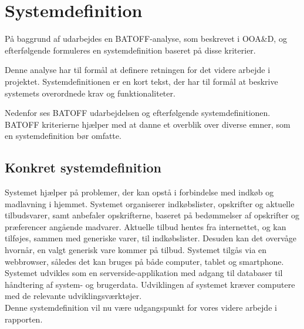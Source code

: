 \section{Systemdefinition}
På baggrund af  udarbejdes en BATOFF-analyse, som beskrevet i OOA\&D\citep{OOA&D2001}, og efterfølgende formuleres en systemdefinition baseret på disse kriterier.

Denne analyse har til formål at definere retningen for det videre arbejde i projektet.
Systemdefinitionen er en kort tekst, der har til formål at beskrive systemets overordnede krav og funktionaliteter.

Nedenfor ses BATOFF udarbejdelsen og efterfølgende systemdefinitionen.
BATOFF kriterierne hjælper med at danne et overblik over diverse emner, som en systemdefinition bør omfatte.




\subsection{Konkret systemdefinition}\label{Sysdef}

Systemet hjælper på problemer, der kan opstå i forbindelse med indkøb og madlavning i hjemmet.
Systemet organiserer indkøbslister, opskrifter og aktuelle tilbudsvarer, samt anbefaler opskrifterne, baseret på bedømmelser af opskrifter og præferencer angående madvarer.
Aktuelle tilbud hentes fra internettet, og kan tilføjes, sammen med generiske varer, til indkøbslister.
Desuden kan det overvåge hvornår, en valgt generisk vare kommer på tilbud.
Systemet tilgås via en webbrowser, således det kan bruges på både computer, tablet og smartphone.
Systemet udvikles som en serverside-applikation med adgang til databaser til håndtering af system- og brugerdata.
Udviklingen af systemet kræver computere med de relevante udviklingsværktøjer.\\

Denne systemdefinition vil nu være udgangspunkt for vores videre arbejde i rapporten.
